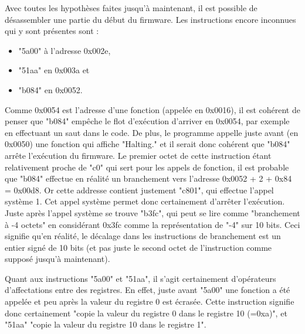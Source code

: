 \documentclass[a4paper,10pt]{article}
\begin{document}
Avec toutes les hypothèses faites jusqu'à maintenant, il est possible de désassembler une partie du début du firmware. Les instructions encore inconnues qui y sont présentes sont :
\begin{itemize}
\item "5a00" à l'adresse 0x002e,
\item "51aa" en 0x003a et
\item "b084" en 0x0052.
\end{itemize}

Comme 0x0054 est l'adresse d'une fonction (appelée en 0x0016), il est cohérent de penser que "b084" empêche le flot d'exécution d'arriver en 0x0054, par exemple en effectuant un saut dans le code. De plus, le programme appelle juste avant (en 0x0050) une fonction qui affiche "Halting." et il serait donc cohérent que "b084" arrête l'exécution du firmware. Le premier octet de cette instruction étant relativement proche de "c0" qui sert pour les appels de fonction, il est probable que "b084" effectue en réalité un branchement vers l'adresse 0x0052 + 2 + 0x84 = 0x00d8. Or cette addresse contient justement "c801", qui effectue l'appel système 1. Cet appel système permet donc certainement d'arrêter l'exécution. Juste après l'appel système se trouve "b3fc", qui peut se lire comme "branchement à -4 octets" en considérant 0x3fc comme la représentation de "-4" sur 10 bits. Ceci signifie qu'en réalité, le décalage dans les instructions de branchement est un entier signé de 10 bits (et pas juste le second octet de l'instruction comme supposé jusqu'à maintenant).

Quant aux instructions "5a00" et "51aa", il s'agit certainement d'opérateurs d'affectations entre des registres. En effet, juste avant "5a00" une fonction a été appelée et peu après la valeur du registre 0 est écrasée. Cette instruction signifie donc certainement "copie la valeur du registre 0 dans le registre 10 (=0xa)", et "51aa" "copie la valeur du registre 10 dans le registre 1".
\end{document}
